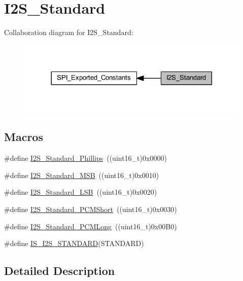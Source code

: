 \hypertarget{group___i2_s___standard}{}\section{I2\+S\+\_\+\+Standard}
\label{group___i2_s___standard}
Collaboration diagram for I2\+S\+\_\+\+Standard\+:
\nopagebreak
\begin{figure}[H]
\begin{center}
\leavevmode
\includegraphics[width=317pt]{group___i2_s___standard}
\end{center}
\end{figure}
\subsection*{Macros}
\begin{DoxyCompactItemize}
\item 
\#define \hyperlink{group___i2_s___standard_gacdb89d66a2a941924ff4b7a8d14884f9}{I2\+S\+\_\+\+Standard\+\_\+\+Phillips}~((uint16\+\_\+t)0x0000)
\item 
\#define \hyperlink{group___i2_s___standard_gae716cfa7e031affc37fe65dd80b0e6f4}{I2\+S\+\_\+\+Standard\+\_\+\+M\+SB}~((uint16\+\_\+t)0x0010)
\item 
\#define \hyperlink{group___i2_s___standard_ga88bc9001a13b95a0844d81fea2080df6}{I2\+S\+\_\+\+Standard\+\_\+\+L\+SB}~((uint16\+\_\+t)0x0020)
\item 
\#define \hyperlink{group___i2_s___standard_gaaf59e587048ff632037dfc9875ab4c7b}{I2\+S\+\_\+\+Standard\+\_\+\+P\+C\+M\+Short}~((uint16\+\_\+t)0x0030)
\item 
\#define \hyperlink{group___i2_s___standard_gaf79cb88702059506d876dbd776d7a136}{I2\+S\+\_\+\+Standard\+\_\+\+P\+C\+M\+Long}~((uint16\+\_\+t)0x00\+B0)
\item 
\#define \hyperlink{group___i2_s___standard_ga826b9ddb34520b8fa64c2b65c9bfd528}{I\+S\+\_\+\+I2\+S\+\_\+\+S\+T\+A\+N\+D\+A\+RD}(S\+T\+A\+N\+D\+A\+RD)
\end{DoxyCompactItemize}


\subsection{Detailed Description}


